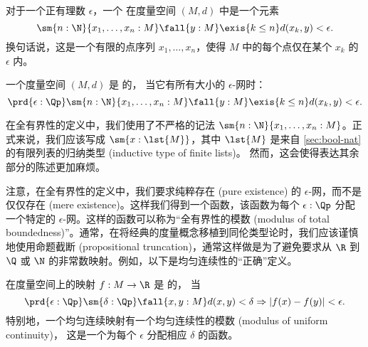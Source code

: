 \begin{defn} \label{defn:total-bounded-metric-space}
对于一个正有理数 $\epsilon$，一个 
%
在度量空间 $(M, d)$ 中是一个元素
%
\begin{equation*}
  \sm{n : \N}{x_1, \ldots, x_n : M}
  \fall{y : M} \exis{k \leq n} d(x_k, y) < \epsilon.
\end{equation*}
%
换句话说，这是一个有限的点序列 $x_1, \ldots, x_n$，使得 $M$ 中的每个点仅在某个 $x_k$ 的 $\epsilon$ 内。

一个度量空间 $(M, d)$ 是  的，
%
%
当它有所有大小的 $\epsilon$-网时：
%
\begin{equation*}
  \prd{\epsilon : \Qp}
  \sm{n : \N}{x_1, \ldots, x_n : M}
  \fall{y : M} \exis{k \leq n} d(x_k, y) < \epsilon.
\end{equation*}
\end{defn}

\begin{rmk}
  在全有界性的定义中，我们使用了不严格的记法 $\sm{n : \N}{x_1, \ldots, x_n : M}$。正式来说，我们应该写成 $\sm{x : \lst{M}}$，其中 $\lst{M}$ 是来自 \cref{sec:bool-nat} 的有限列表的归纳类型 (inductive type of finite lists)。
  然而，这会使得表达其余部分的陈述更加麻烦。
\end{rmk}

注意，在全有界性的定义中，我们要求纯粹存在 (pure existence) 的 $\epsilon$-网，而不是仅仅存在 (mere existence)。这样我们得到一个函数，该函数为每个 $\epsilon : \Qp$ 分配一个特定的 $\epsilon$-网。这样的函数可以称为“全有界性的模数 (modulus of total boundedness)”。通常，在将经典的度量概念移植到同伦类型论时，我们应该谨慎地使用命题截断 (propositional truncation)，通常这样做是为了避免要求从 $\R$ 到 $\Q$ 或 $\N$ 的非常数映射。例如，以下是均匀连续性的“正确”定义。

\begin{defn} \label{defn:uniformly-continuous}
在度量空间上的映射 $f : M \to \R$ 是  的，
%
%
当
%
\begin{equation*}
  \prd{\epsilon : \Qp}
  \sm{\delta : \Qp}
  \fall{x, y : M}
  d(x,y) < \delta \Rightarrow |f(x) - f(y)| < \epsilon.
\end{equation*}
%
特别地，一个均匀连续映射有一个均匀连续性的模数 (modulus of uniform continuity)，
这是一个为每个 $\epsilon$ 分配相应 $\delta$ 的函数。
\end{defn}

